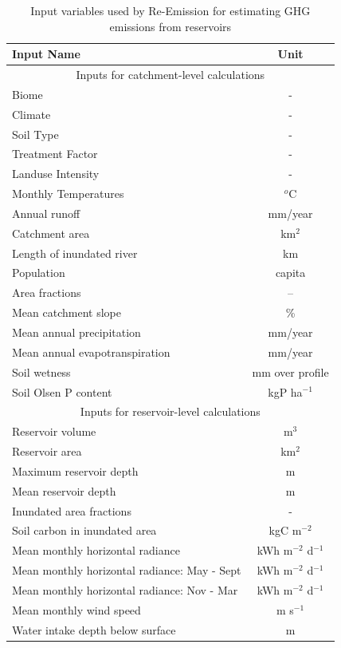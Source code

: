 \documentclass[final,1p,times]{elsarticle}
\begin{document}
\begin{table}[ht]
	\small
    \caption{Input variables used by Re-Emission for estimating \ac{GHG} emissions from reservoirs}
    \label{app_table:input_variables}%
    \begin{tabular*}{\linewidth}{@{\extracolsep{\fill}}lc@{}}
    \toprule
    Input Name & Unit \\
    \midrule%
    \multicolumn{2}{c}{Inputs for catchment{-}level calculations}\\%
    Biome&{-} \\%
    Climate&{-} \\%
    Soil Type&{-} \\%
    Treatment Factor&{-}\\%
    Landuse Intensity&{-}\\%
    Monthly Temperatures&$^o$C\\%
    Annual runoff&mm/year\\%
    Catchment area&km$^2$\\%
    Length of inundated river&km\\%
    Population&capita\\%
    Area fractions\footnotemark[1]&--\\%
    Mean catchment slope&\%\\%
    Mean annual precipitation&mm/year\\%
    Mean annual evapotranspiration&mm/year\\%
    Soil wetness&mm over profile\\%
    Soil Olsen P content&kgP ha$^{-1}$\\%
    \midrule%
    \multicolumn{2}{c}{Inputs for reservoir{-}level calculations}\\%
    Reservoir volume&m$^3$\\%
    Reservoir area&km$^2$\\%
    Maximum reservoir depth&m\\%
    Mean reservoir depth&m\\%
    Inundated area fractions\footnotemark[1]&-\\%
    Soil carbon in inundated area&kgC m$^{-2}$\\%
    Mean monthly horizontal radiance&kWh m$^{-2}$ d$^{-1}$\\%
    Mean monthly horizontal radiance: May {-} Sept&kWh m$^{-2}$ d$^{-1}$\\%
    Mean monthly horizontal radiance: Nov {-} Mar&kWh m$^{-2}$ d$^{-1}$\\%
    Mean monthly wind speed&m s$^{-1}$\\%
    Water intake depth below surface&m\\
    \bottomrule
    \end{tabular*}
    \label{reemission_table}
\end{table}
\end{document}

